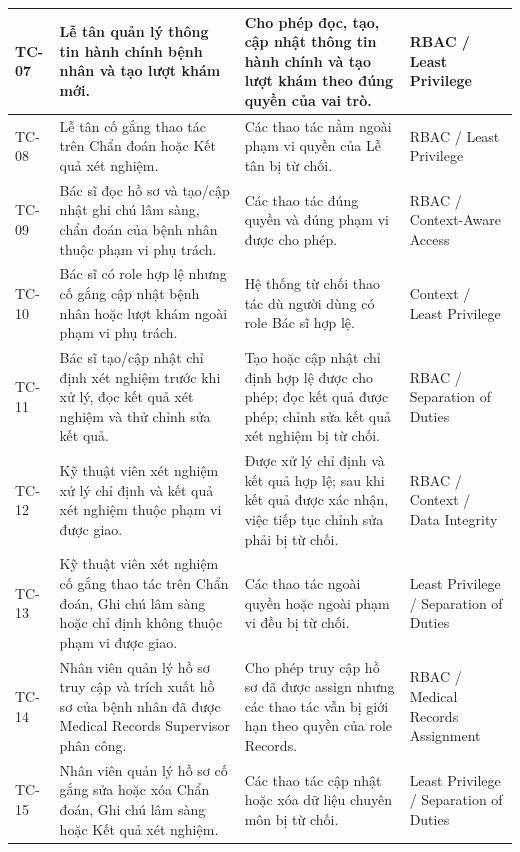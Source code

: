 \begin{longtable}{|
>{\centering\arraybackslash}p{1.1cm} |
>{\raggedright\arraybackslash}p{4.8cm} |
>{\raggedright\arraybackslash}p{4.8cm} |
>{\raggedright\arraybackslash}p{3.5cm} |
}
TC-07 &
Lễ tân quản lý thông tin hành chính bệnh nhân và tạo lượt khám mới. &
Cho phép đọc, tạo, cập nhật thông tin hành chính và tạo lượt khám theo đúng quyền của vai trò. &
RBAC / Least Privilege \\
\hline

TC-08 &
Lễ tân cố gắng thao tác trên Chẩn đoán hoặc Kết quả xét nghiệm. &
Các thao tác nằm ngoài phạm vi quyền của Lễ tân bị từ chối. &
RBAC / Least Privilege \\
\hline

TC-09 &
Bác sĩ đọc hồ sơ và tạo/cập nhật ghi chú lâm sàng, chẩn đoán của bệnh nhân thuộc phạm vi phụ trách. &
Các thao tác đúng quyền và đúng phạm vi được cho phép. &
RBAC / Context-Aware Access \\
\hline

TC-10 &
Bác sĩ có role hợp lệ nhưng cố gắng cập nhật bệnh nhân hoặc lượt khám ngoài phạm vi phụ trách. &
Hệ thống từ chối thao tác dù người dùng có role Bác sĩ hợp lệ. &
Context / Least Privilege \\
\hline

TC-11 &
Bác sĩ tạo/cập nhật chỉ định xét nghiệm trước khi xử lý, đọc kết quả xét nghiệm và thử chỉnh sửa kết quả. &
Tạo hoặc cập nhật chỉ định hợp lệ được cho phép; đọc kết quả được phép; chỉnh sửa kết quả xét nghiệm bị từ chối. &
RBAC / Separation of Duties \\
\hline

TC-12 &
Kỹ thuật viên xét nghiệm xử lý chỉ định và kết quả xét nghiệm thuộc phạm vi được giao. &
Được xử lý chỉ định và kết quả hợp lệ; sau khi kết quả được xác nhận, việc tiếp tục chỉnh sửa phải bị từ chối. &
RBAC / Context / Data Integrity \\
\hline

TC-13 &
Kỹ thuật viên xét nghiệm cố gắng thao tác trên Chẩn đoán, Ghi chú lâm sàng hoặc chỉ định không thuộc phạm vi được giao. &
Các thao tác ngoài quyền hoặc ngoài phạm vi đều bị từ chối. &
Least Privilege / Separation of Duties \\
\hline

TC-14 &
Nhân viên quản lý hồ sơ truy cập và trích xuất hồ sơ của bệnh nhân đã được Medical Records Supervisor phân công. &
Cho phép truy cập hồ sơ đã được assign nhưng các thao tác vẫn bị giới hạn theo quyền của role Records. &
RBAC / Medical Records Assignment \\
\hline

TC-15 &
Nhân viên quản lý hồ sơ cố gắng sửa hoặc xóa Chẩn đoán, Ghi chú lâm sàng hoặc Kết quả xét nghiệm. &
Các thao tác cập nhật hoặc xóa dữ liệu chuyên môn bị từ chối. &
Least Privilege / Separation of Duties \\
\hline


\end{longtable}
